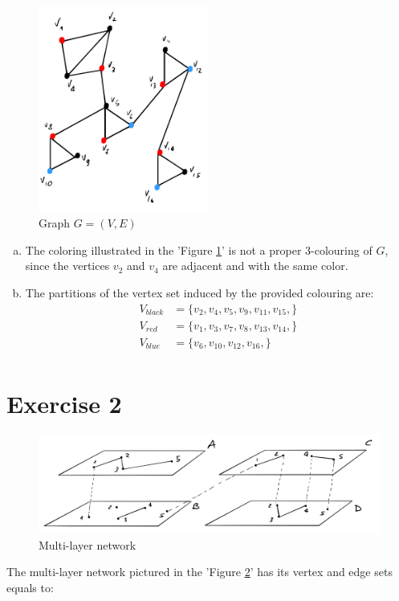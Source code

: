 \documentclass{article}
\begin{document}
    \begin{figure}[H]
        \centering
        \includegraphics[width=0.5\textwidth]{2.png}
        \caption{Graph \(G=(V,E)\)}
        \label{fig:figure-2}
    \end{figure}
    
    \begin{enumerate}[c)]
        \item The coloring illustrated in the 'Figure \ref{fig:figure-2}' is not a proper 3-colouring of \(G\), since the vertices \(v_{2}\) and \(v_{4}\) are adjacent and with the same color.
        
        \item The partitions of the vertex set induced by the provided colouring are:
        \begin{align*}
            V_{black} &= \{v_{2},v_{4},v_{5},v_{9},v_{11},v_{15},\} \\
            V_{red} &= \{v_{1},v_{3},v_{7},v_{8},v_{13},v_{14},\} \\
            V_{blue} &= \{v_{6},v_{10},v_{12},v_{16},\} \\
        \end{align*}
    \end{enumerate}
    
\section{Exercise 2}
    \begin{figure}[H]
        \centering
        \includegraphics[width=\textwidth]{3.png}
        \caption{Multi-layer network}
        \label{fig:figure-3}
    \end{figure}
    The multi-layer network pictured in the 'Figure \ref{fig:figure-3}' has its vertex and edge sets equals to:
    
\end{document}
